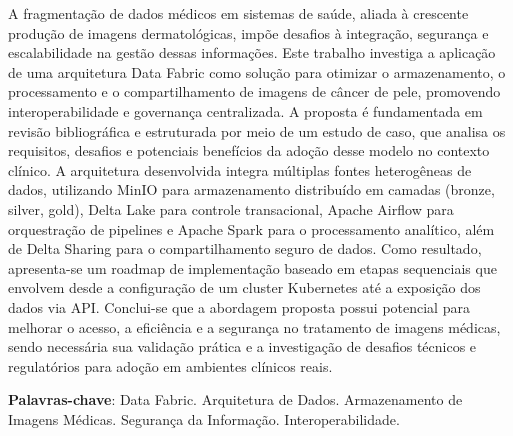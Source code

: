 \begin{resumo}
    A fragmentação de dados médicos em sistemas de saúde, aliada à crescente produção de imagens dermatológicas, impõe desafios à integração, segurança e escalabilidade na gestão dessas informações. Este trabalho investiga a aplicação de uma arquitetura Data Fabric como solução para otimizar o armazenamento, o processamento e o compartilhamento de imagens de câncer de pele, promovendo interoperabilidade e governança centralizada. A proposta é fundamentada em revisão bibliográfica e estruturada por meio de um estudo de caso, que analisa os requisitos, desafios e potenciais benefícios da adoção desse modelo no contexto clínico. A arquitetura desenvolvida integra múltiplas fontes heterogêneas de dados, utilizando MinIO para armazenamento distribuído em camadas (bronze, silver, gold), Delta Lake para controle transacional, Apache Airflow para orquestração de pipelines e Apache Spark para o processamento analítico, além de Delta Sharing para o compartilhamento seguro de dados. Como resultado, apresenta-se um roadmap de implementação baseado em etapas sequenciais que envolvem desde a configuração de um cluster Kubernetes até a exposição dos dados via API. Conclui-se que a abordagem proposta possui potencial para melhorar o acesso, a eficiência e a segurança no tratamento de imagens médicas, sendo necessária sua validação prática e a investigação de desafios técnicos e regulatórios para adoção em ambientes clínicos reais.
\vspace{\onelineskip}
    
\noindent
\textbf{Palavras-chave}: Data Fabric. Arquitetura de Dados. Armazenamento de Imagens Médicas. Segurança da Informação. Interoperabilidade.
\end{resumo}